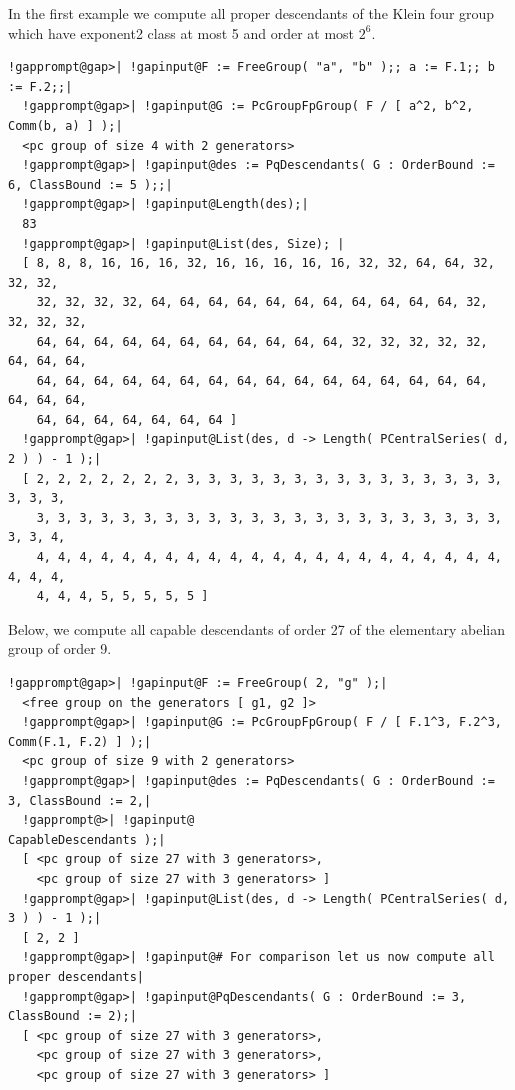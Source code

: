 \documentclass[a4paper,11pt]{report}
\begin{document}
{{{ In the first example we compute all proper descendants of the Klein four group
which have exponent\texttt{}2 class at most 5 and order at most $2^6$. 
\begin{Verbatim}[commandchars=!@|,fontsize=\small,frame=single,label=Example]
  !gapprompt@gap>| !gapinput@F := FreeGroup( "a", "b" );; a := F.1;; b := F.2;;|
  !gapprompt@gap>| !gapinput@G := PcGroupFpGroup( F / [ a^2, b^2, Comm(b, a) ] );|
  <pc group of size 4 with 2 generators>
  !gapprompt@gap>| !gapinput@des := PqDescendants( G : OrderBound := 6, ClassBound := 5 );;|
  !gapprompt@gap>| !gapinput@Length(des);|
  83
  !gapprompt@gap>| !gapinput@List(des, Size); |
  [ 8, 8, 8, 16, 16, 16, 32, 16, 16, 16, 16, 16, 32, 32, 64, 64, 32, 32, 32, 
    32, 32, 32, 32, 64, 64, 64, 64, 64, 64, 64, 64, 64, 64, 64, 32, 32, 32, 32, 
    64, 64, 64, 64, 64, 64, 64, 64, 64, 64, 64, 32, 32, 32, 32, 32, 64, 64, 64, 
    64, 64, 64, 64, 64, 64, 64, 64, 64, 64, 64, 64, 64, 64, 64, 64, 64, 64, 64, 
    64, 64, 64, 64, 64, 64, 64 ]
  !gapprompt@gap>| !gapinput@List(des, d -> Length( PCentralSeries( d, 2 ) ) - 1 );|
  [ 2, 2, 2, 2, 2, 2, 2, 3, 3, 3, 3, 3, 3, 3, 3, 3, 3, 3, 3, 3, 3, 3, 3, 3, 3, 
    3, 3, 3, 3, 3, 3, 3, 3, 3, 3, 3, 3, 3, 3, 3, 3, 3, 3, 3, 3, 3, 3, 3, 3, 4, 
    4, 4, 4, 4, 4, 4, 4, 4, 4, 4, 4, 4, 4, 4, 4, 4, 4, 4, 4, 4, 4, 4, 4, 4, 4, 
    4, 4, 4, 5, 5, 5, 5, 5 ]
\end{Verbatim}
 Below, we compute all capable descendants of order 27 of the elementary
abelian group of order 9. 
\begin{Verbatim}[commandchars=!@|,fontsize=\small,frame=single,label=Example]
  !gapprompt@gap>| !gapinput@F := FreeGroup( 2, "g" );|
  <free group on the generators [ g1, g2 ]>
  !gapprompt@gap>| !gapinput@G := PcGroupFpGroup( F / [ F.1^3, F.2^3, Comm(F.1, F.2) ] );|
  <pc group of size 9 with 2 generators>
  !gapprompt@gap>| !gapinput@des := PqDescendants( G : OrderBound := 3, ClassBound := 2,|
  !gapprompt@>| !gapinput@                             CapableDescendants );|
  [ <pc group of size 27 with 3 generators>, 
    <pc group of size 27 with 3 generators> ]
  !gapprompt@gap>| !gapinput@List(des, d -> Length( PCentralSeries( d, 3 ) ) - 1 );|
  [ 2, 2 ]
  !gapprompt@gap>| !gapinput@# For comparison let us now compute all proper descendants|
  !gapprompt@gap>| !gapinput@PqDescendants( G : OrderBound := 3, ClassBound := 2);|
  [ <pc group of size 27 with 3 generators>, 
    <pc group of size 27 with 3 generators>, 
    <pc group of size 27 with 3 generators> ]
\end{Verbatim}
}}}
\end{document}
